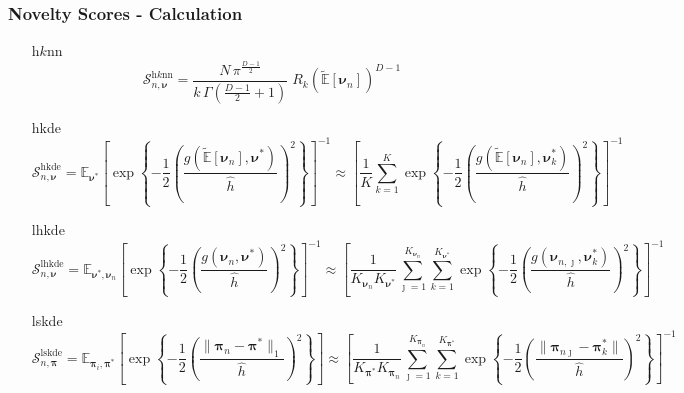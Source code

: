 \documentclass[aspectratio=169,10pt]{beamer}
\begin{document}
\begin{frame}
    \frametitle{Novelty Scores - Calculation}
    \label{ndpg:noveltyscoresdetail}
    {\footnotesize
    \begin{enumerate}
        \item[h$k$nn]
        \[
        \mathcal{S}_{n,\bm{\nu}}^{\text{h$k$nn}} = 
            \frac{N\,\pi^{\frac{D-1}{2}}}{k\,\Gamma\left(\frac{D-1}{2} + 1\right)}
            \;R_{k}\left(\tilde{\mathbb{E}}[\bm{\nu}_n]\right)^{D-1}
        \]
        \item[hkde]
        \[
        \mathcal{S}_{n,\bm{\nu}}^{\text{hkde}} = \mathbb{E}_{\bm{\nu}^*}\left[
            \exp\left\lbrace
            -\frac{1}{2}\left(
            \frac{g(\tilde{\mathbb{E}}[\bm{\nu}_n], \bm{\nu}^*)}{\hat{h}}
            \right)^2
            \right\rbrace
            \right]^{-1} \approx \left[\frac{1}{K}\sum_{k = 1}^{K}
                \exp\left\lbrace-\frac{1}{2}\left(
                \frac{g(\tilde{\mathbb{E}}[\bm{\nu}_n],\bm{\nu}_k^*)}{\hat{h}}
                \right)^2\right\rbrace\right]^{-1}
        \]
        \item[lhkde]
        \[
        \mathcal{S}_{n,\bm{\nu}}^{\text{lhkde}} = 
            \mathbb{E}_{\bm{\nu}^*,\bm{\nu}_n}\left[
            \exp\left\lbrace
            -\frac{1}{2}\left(
            \frac{g(\bm{\nu}_n, \bm{\nu}^*)}{\hat{h}}
            \right)^2
            \right\rbrace
            \right]^{-1} \approx \left[
                \frac{1}{K_{\bm{\nu}_n}K_{\bm{\nu}^*}}
                \sum_{\jmath = 1}^{K_{\bm{\nu}_n}}\sum_{k = 1}^{K_{\bm{\nu}^*}}
                \exp\left\lbrace-\frac{1}{2}
                \left(\frac{g(\bm{\nu}_{n,\jmath},\bm{\nu}_{k}^*)}{\hat{h}}\right)^2
                \right\rbrace
                \right]^{-1}
        \]
        \item[lskde]
        \[
        \mathcal{S}_{n,\bm{\pi}}^{\text{lskde}} = \mathbb{E}_{\bm{\pi}_i,\bm{\pi}^*}
        \left[\exp\left\lbrace -\frac{1}{2}\left(
            \frac{\lVert \bm{\pi}_n - \bm{\pi}^*\rVert_1}{\hat{h}}
            \right)^2\right\rbrace
        \right]
        \approx 
        \left[
            \frac{1}{K_{\bm{\pi}^*}K_{\bm{\pi}_n}}\sum_{\jmath=1}^{K_{\bm{\pi}_n}}
                \sum_{k=1}^{K_{\bm{\pi}^*}}\exp\left\lbrace
            -\frac{1}{2}
                \left(\frac{\lVert \bm{\pi}_{n\jmath} - \bm{\pi}_k^*\rVert}{\hat{h}}\right)^2
            \right\rbrace
        \right]^{-1}
        \]
    \end{enumerate}
    }
    \hyperlink{ndpg:noveltyscores}{}
\end{frame} %
\end{document}
